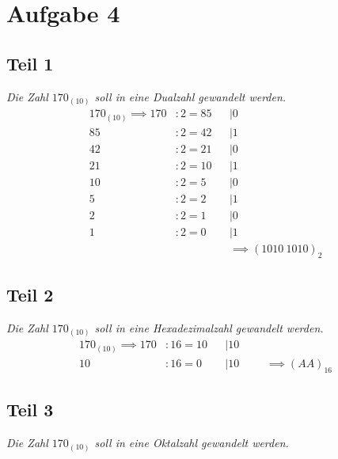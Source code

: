 \chapter{Aufgabe 4}

\section{Teil 1}


\textit{Die Zahl $170_{(10)}$ soll in eine Dualzahl gewandelt werden.}\\

\begin{equation}
\begin{alignat}{3}
    170_{(10)}  \implies 170 &  : 2  = 85 && |  0\\
      85 & : 2 = 42 &&| 1\\
      42 & : 2  = 21 &&| 0\\
      21 & : 2  = 10 &&| 1\\
      10 & : 2  = 5 && | 0\\
      5 & : 2  = 2 && | 1\\
      2 & : 2  = 1 && | 0\\
      1 & : 2  = 0 && | 1 \\
    & && \implies (1 0 1 0 \ 1 0 1 0)_{2}
\end{alignat}
\end{equation}

\section{Teil 2}


\textit{Die Zahl $170_{(10)}$ soll in eine Hexadezimalzahl gewandelt werden.}\\

\begin{equation}
    \begin{alignat}{3}
        170_{(10)}  \implies 170 &  : 16 = 10 && | 10\\
        10 & : 16  = 0 && | 10
        & && \implies (AA)_{16}
    \end{alignat}
\end{equation}


\section{Teil 3}


\textit{Die Zahl $170_{(10)}$ soll in eine Oktalzahl gewandelt werden.}\\

